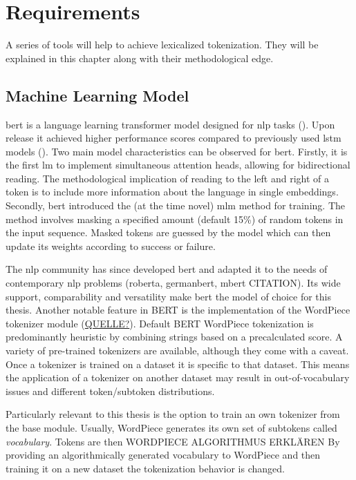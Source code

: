 \documentclass[english]{ttlab-qualify}
\begin{document}
    \section{Requirements}
    \label{sec:requirements}
    A series of tools will help to achieve lexicalized tokenization.
    They will be explained in this chapter along with their methodological edge.

    \subsection{Machine Learning Model}
    \label{subsec:mlm}

    \ac{bert} is a language learning transformer model designed for \ac{nlp} tasks (\cite{ATTENTION}).
    Upon release it achieved higher performance scores compared to previously used \ac{lstm} models (\cite{BERTHIGH1}).
    Two main model characteristics can be observed for \ac{bert}.
    Firstly, it is the first \ac{lm} to implement simultaneous attention heads, allowing for bidirectional reading.
    The methodological implication of reading to the left and right of a token is to include more information about the language in single embeddings.
    Secondly, \ac{bert} introduced the (at the time novel) \ac{mlm} method for training.
    The method involves masking a specified amount (default 15\%) of random tokens in the input sequence.
    Masked tokens are guessed by the model which can then update its weights according to success or failure.

    The \ac{nlp} community has since developed \ac{bert} and adapted it to the needs of contemporary \ac{nlp} problems (roberta, germanbert, mbert \uppercase{citation}).
    Its wide support, comparability and versatility make \ac{bert} the model of choice for this thesis.
    Another notable feature in \uppercase{bert} is the implementation of the WordPiece tokenizer module (\uppercase{\href{https://huggingface.co/course/chapter6/6?fw=pt}{quelle?}}).
    Default BERT WordPiece tokenization is predominantly heuristic by combining strings based on a precalculated score.
    A variety of pre-trained tokenizers are available, although they come with a caveat.
    Once a tokenizer is trained on a dataset it is specific to that dataset.
    This means the application of a tokenizer on another dataset may result in out-of-vocabulary issues and different token/subtoken distributions.

    Particularly relevant to this thesis is the option to train an own tokenizer from the base module.
    Usually, WordPiece generates its own set of subtokens called \textit{vocabulary}.
    Tokens are then \uppercase{WORDPIECE algorithmus erklären}
    By providing an algorithmically generated vocabulary to WordPiece and then training it on a new dataset the tokenization behavior is changed.
\end{document}
